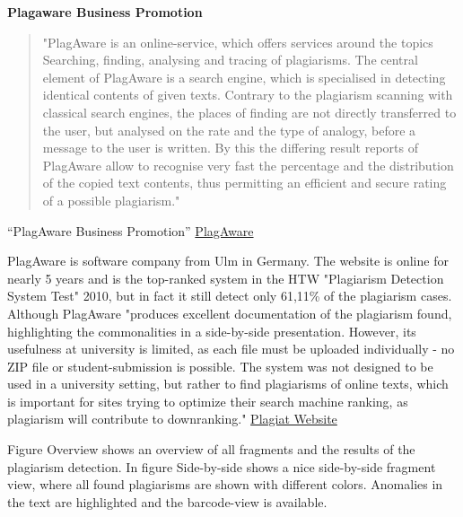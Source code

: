 \textbf{Plagaware Business Promotion}
\begin{quote}
"PlagAware is an online-service, which offers services around the topics Searching, finding, analysing and tracing of plagiarisms. The central element of PlagAware is a search engine, which is specialised in detecting identical contents of given texts. Contrary to the plagiarism scanning with classical search engines, the places of finding are not directly transferred to the user, but analysed on the rate and the type of analogy, before a message to the user is written. By this the differing result reports of PlagAware allow to recognise very fast the percentage and the distribution of the copied text contents, thus permitting an efficient and secure rating of a possible plagiarism."  
\end{quote}
\enquote{PlagAware Business Promotion}\citep{PlagAware Website} \href{http://www.plagaware.de}{PlagAware}



PlagAware is software company from Ulm in Germany. The website is online for nearly 5 years and is the top-ranked system in the HTW "Plagiarism Detection System Test" 2010, but in fact it still detect only 61,11\% of the plagiarism cases. 
Although PlagAware "produces excellent documentation of the plagiarism found, highlighting the commonalities in a side-by-side presentation. However, its usefulness at university is limited, as each file must be uploaded individually - no ZIP file or student-submission is possible. The system was not designed to be used in a university setting, but rather to find plagiarisms of online texts, which is important for sites trying to optimize their search machine ranking, as plagiarism will contribute to downranking." \href{http://plagiat.htw-berlin.de/software-en/2010-2/s10-05-plagaware/}{Plagiat Website}

Figure Overview shows an overview of all fragments and the results of the plagiarism detection. In figure Side-by-side shows a nice side-by-side fragment view, where all found plagiarisms are shown with different colors. Anomalies in the text are highlighted and the barcode-view is available.
 
